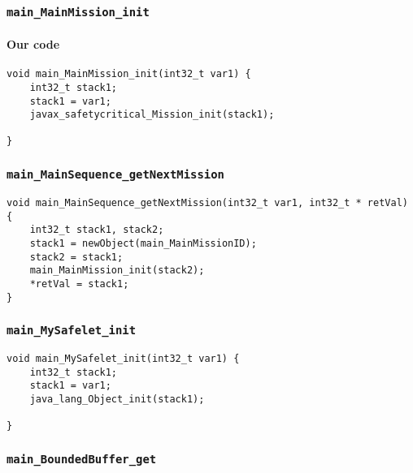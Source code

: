 \begin{landscape}
\begin{multicols}{2}
\subsubsection{\texttt{main\_MainMission\_init}}

\paragraph{Our code}\hfill
\begin{lstlisting}[firstnumber=1871]
void main_MainMission_init(int32_t var1) {
	int32_t stack1;
	stack1 = var1;
	javax_safetycritical_Mission_init(stack1);

}
\end{lstlisting}

\subsubsection{\texttt{main\_MainSequence\_getNextMission}}

\begin{lstlisting}[firstnumber=1983]
void main_MainSequence_getNextMission(int32_t var1, int32_t * retVal) {
	int32_t stack1, stack2;
	stack1 = newObject(main_MainMissionID);
	stack2 = stack1;
	main_MainMission_init(stack2);
	*retVal = stack1;
}
\end{lstlisting}

\subsubsection{\texttt{main\_MySafelet\_init}}

\begin{lstlisting}[firstnumber=2084]
void main_MySafelet_init(int32_t var1) {
	int32_t stack1;
	stack1 = var1;
	java_lang_Object_init(stack1);

}
\end{lstlisting}

\subsubsection{\texttt{main\_BoundedBuffer\_get}}


\end{multicols}
\end{landscape}
